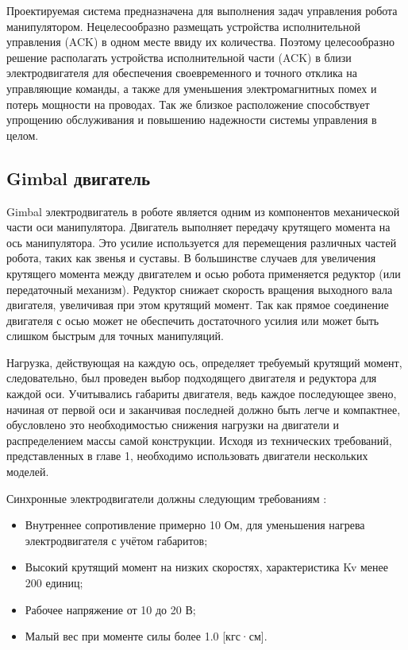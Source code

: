 Проектируемая система предназначена для выполнения задач управления  робота манипулятором. Нецелесообразно размещать устройства исполнительной управления (ACK) в одном месте ввиду их количества. Поэтому целесообразно решение располагать устройства исполнительной части (ACK) в близи электродвигателя для обеспечения своевременного и точного отклика на управляющие команды, а также для уменьшения электромагнитных помех и потерь мощности на проводах. Так же близкое расположение способствует упрощению обслуживания и повышению надежности системы управления в целом.

\subsection{Gimbal двигатель}

Gimbal электродвигатель в роботе является одним из компонентов механической части оси манипулятора. Двигатель выполняет передачу крутящего момента на ось манипулятора. Это усилие используется для перемещения различных частей робота, таких как звенья и суставы. В большинстве случаев для увеличения крутящего момента между двигателем и осью робота применяется редуктор (или передаточный механизм). Редуктор снижает скорость вращения выходного вала двигателя, увеличивая при этом крутящий момент. Так как прямое соединение двигателя с осью может не обеспечить достаточного усилия или может быть слишком быстрым для точных манипуляций.

Нагрузка, действующая на каждую ось, определяет требуемый крутящий момент, следовательно, был проведен выбор подходящего двигателя и редуктора для каждой оси. Учитывались габариты двигателя, ведь каждое последующее звено, начиная от первой оси и заканчивая последней должно быть легче и компактнее, обусловлено это необходимостью снижения нагрузки на двигатели и распределением массы самой конструкции. Исходя из технических требований, представленных в главе 1, необходимо использовать двигатели нескольких моделей.

Синхронные электродвигатели должны  следующим требованиям :

\begin{itemize}
	\item Внутреннее сопротивление примерно 10 Ом, для уменьшения нагрева электродвигателя с учётом габаритов;
	\item Высокий крутящий момент на низких скоростях, характеристика Kv менее 200 единиц;
	\item Рабочее напряжение от 10 до 20 В;
	\item Малый вес при моменте силы более 1.0 [кгс·см].
\end{itemize}

